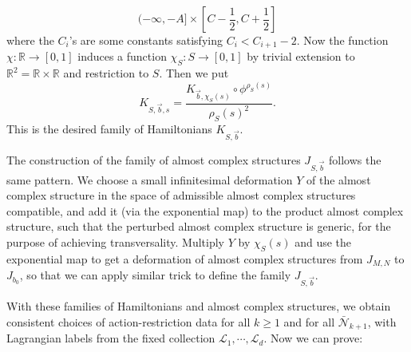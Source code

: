 \documentclass{amsart}
\numberwithin{equation}{section}
\numberwithin{figure}{section}
\begin{document}
\begin{equation*}
(-\infty, -A] \times [C - \frac{1}{2}, C + \frac{1}{2}]
\end{equation*}
where the $C_{i}$'s are some constants satisfying $C_{i} < C_{i+1} - 2$. Now the function $\chi: \mathbb{R} \to [0, 1]$ induces a function $\chi_{S}: S \to [0, 1]$ by trivial extension to $\mathbb{R}^{2} = \mathbb{R} \times \mathbb{R}$ and restriction to $S$. Then we put
\begin{equation}
K_{S, \vec{b}, s} = \frac{K_{\vec{b}, \chi_{S}(s)} \circ \phi^{\rho_{S}(s)}}{\rho_{S}(s)^{2}}.
\end{equation}
This is the desired family of Hamiltonians $K_{S, \vec{b}}$. \par
	The construction of the family of almost complex structures $J_{S, \vec{b}}$ follows the same pattern. We choose a small infinitesimal deformation $Y$ of the almost complex structure in the space of admissible almost complex structures compatible, and add it (via the exponential map) to the product almost complex structure, such that the perturbed almost complex structure is generic, for the purpose of achieving transversality. Multiply $Y$ by $\chi_{S}(s)$ and use the exponential map to get a deformation of almost complex structures from $J_{M, N}$ to $J_{b_{0}}$, so that we can apply similar trick to define the family $J_{S, \vec{b}}$. \par
	With these families of Hamiltonians and almost complex structures, we obtain consistent choices of action-restriction data for all $k \ge 1$ and for all $\bar{\mathcal{N}}_{k+1}$, with Lagrangian labels from the fixed collection $\mathcal{L}_{1}, \cdots, \mathcal{L}_{d}$. Now we can prove: \par
\end{document}
